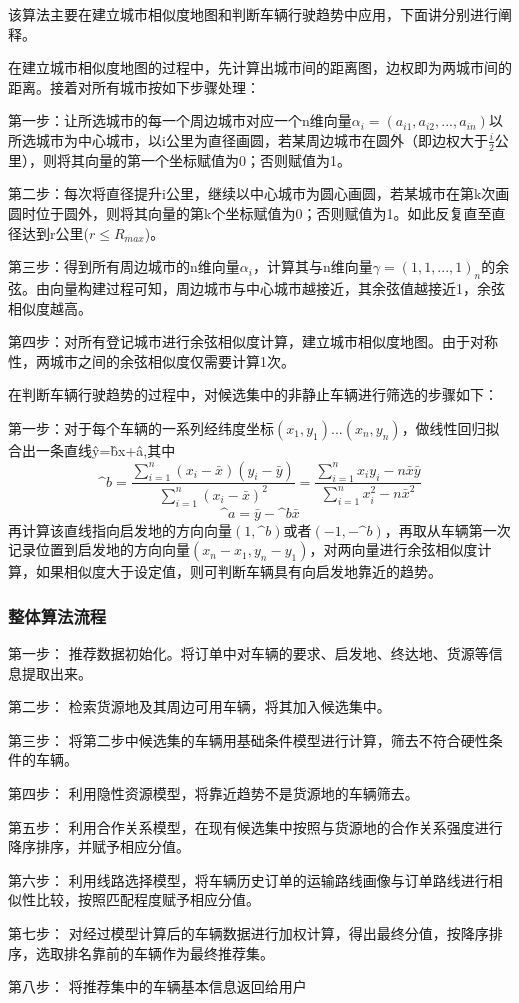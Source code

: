 \documentclass[UTF8]{ctexart}
\begin{document}
\begin{multicols}{2}
该算法主要在建立城市相似度地图和判断车辆行驶趋势中应用，下面讲分别进行阐释。

在建立城市相似度地图的过程中，先计算出城市间的距离图，边权即为两城市间的距离。接着对所有城市按如下步骤处理：

第一步：让所选城市的每一个周边城市对应一个n维向量$\alpha _{i}=(a_{i1},a_{i2},...,a_{in})$以所选城市为中心城市，以i公里为直径画圆，若某周边城市在圆外（即边权大于$\frac{i}{2}$公里），则将其向量的第一个坐标赋值为0；否则赋值为1。

第二步：每次将直径提升i公里，继续以中心城市为圆心画圆，若某城市在第k次画圆时位于圆外，则将其向量的第k个坐标赋值为0；否则赋值为1。如此反复直至直径达到r公里($r \leq R_{max}$)。

第三步：得到所有周边城市的n维向量$\alpha_{i}$，计算其与n维向量$\gamma=(1,1,...,1)_{n}$的余弦。由向量构建过程可知，周边城市与中心城市越接近，其余弦值越接近1，余弦相似度越高。

第四步：对所有登记城市进行余弦相似度计算，建立城市相似度地图。由于对称性，两城市之间的余弦相似度仅需要计算1次。

在判断车辆行驶趋势的过程中，对候选集中的非静止车辆进行筛选的步骤如下：

第一步：对于每个车辆的一系列经纬度坐标$(x_1,y_1)...(x_n,y_n)$，做线性回归拟合出一条直线\^y=\^bx+\^a,其中
$$\^b=\frac{\sum\limits_{i=1}^{n}(x_i-\bar x)(y_i-\bar y)}{\sum\limits_{i=1}^{n}(x_i-\bar x)^2}=\frac{\sum\limits_{i=1}^{n}x_i y_i- n\bar x \bar y}{\sum\limits_{i=1}^{n} x_i^2-n\bar x^2}$$
$$\^a=\bar y -\^b \bar x$$
\indent 再计算该直线指向启发地的方向向量$(1,\^ b)$或者$(-1,-\^ b)$，再取从车辆第一次记录位置到启发地的方向向量$(x_n-x_1,y_n-y_1)$，对两向量进行余弦相似度计算，如果相似度大于设定值，则可判断车辆具有向启发地靠近的趋势。

\subsubsection{整体算法流程}


第一步： 推荐数据初始化。将订单中对车辆的要求、启发地、终达地、货源等信息提取出来。

第二步： 检索货源地及其周边可用车辆，将其加入候选集中。

第三步： 将第二步中候选集的车辆用基础条件模型进行计算，筛去不符合硬性条件的车辆。

第四步： 利用隐性资源模型，将靠近趋势不是货源地的车辆筛去。

第五步： 利用合作关系模型，在现有候选集中按照与货源地的合作关系强度进行降序排序，并赋予相应分值。

第六步： 利用线路选择模型，将车辆历史订单的运输路线画像与订单路线进行相似性比较，按照匹配程度赋予相应分值。

第七步： 对经过模型计算后的车辆数据进行加权计算，得出最终分值，按降序排序，选取排名靠前的车辆作为最终推荐集。

第八步： 将推荐集中的车辆基本信息返回给用户

\end{multicols}
%
\renewcommand{\refname}{参考文献}


\end{document}
